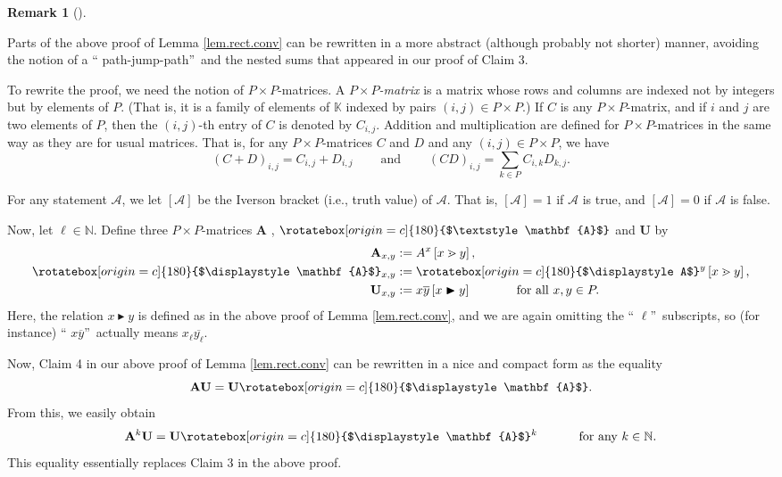 \documentclass[numbers=enddot,12pt,final,onecolumn,notitlepage]{scrartcl}%
\theoremstyle{definition}
\newtheorem{remk}[theo]{Remark}
\newenvironment{remark}[1][]
{\begin{remk}[#1]\begin{leftbar}}
{\end{leftbar}\end{remk}}
\newcommand{\upslack}{\mathchoice{\rotatebox[origin=c]{180}{$\displaystyle A$}}{\rotatebox[origin=c]{180}{$\textstyle A$}}{\rotatebox[origin=c]{180}{$\scriptstyle A$}}{\rotatebox[origin=c]{180}{$\scriptscriptstyle A$}}}
\newcommand{\downslack}{A}
\newcommand{\bfupslack}{\mathchoice{\rotatebox[origin=c]{180}{$\displaystyle \mathbf{A}$}}{\rotatebox[origin=c]{180}{$\textstyle \mathbf{A}$}}{\rotatebox[origin=c]{180}{$\scriptstyle \mathbf{A}$}}{\rotatebox[origin=c]{180}{$\scriptscriptstyle \mathbf{A}$}}}
\newcommand{\bfdownslack}{\mathbf{A}}
\let\sumnonlimits\sum
\renewcommand{\sum}{\sumnonlimits\limits}
\begin{document}
\begin{remark}
\label{rmk.lem.rect.conv.2}Parts of the above proof of Lemma
\ref{lem.rect.conv} can be rewritten in a more abstract (although probably not
shorter) manner, avoiding the notion of a \textquotedblleft
path-jump-path\textquotedblright\ and the nested sums that appeared in our
proof of Claim 3.

To rewrite the proof, we need the notion of $P\times P$-matrices.
A $P\times P$\emph{-matrix} is a matrix whose rows and columns are indexed not
by integers but by elements of $P$. (That is, it is a family of elements of
$\mathbb{K}$ indexed by pairs $\left(  i,j\right)  \in P\times P$.) If $C$ is
any $P\times P$-matrix, and if $i$ and $j$ are two elements of $P$, then the
$\left(  i,j\right)  $-th entry of $C$ is denoted by $C_{i,j}$. Addition and
multiplication are defined for $P\times P$-matrices in the same way as they
are for usual matrices. That is, for any $P\times P$-matrices $C$ and $D$ and
any $\left(  i,j\right)  \in P\times P$, we have%
\[
\left(  C+D\right)  _{i,j}=C_{i,j}+D_{i,j}\ \ \ \ \ \ \ \ \ \ \text{and}%
\ \ \ \ \ \ \ \ \ \ \left(  CD\right)  _{i,j}=\sum_{k\in P}C_{i,k}D_{k,j}.
\]


For any statement $\mathcal{A}$, we let $\left[  \mathcal{A}\right]  $ be the
Iverson bracket (i.e., truth value) of $\mathcal{A}$. That is, $\left[
\mathcal{A}\right]  =1$ if $\mathcal{A}$ is true, and $\left[  \mathcal{A}%
\right]  =0$ if $\mathcal{A}$ is false.

Now, let $\ell\in\mathbb{N}$. Define three $P\times P$-matrices $\bfdownslack$%
, $\bfupslack$ and $\mathbf{U}$ by
\begin{align*}
\bfdownslack_{x,y}  &  :=\downslack^{x}\left[  x\gtrdot y\right]  ,\\
\bfupslack_{x,y}  &  :=\upslack^{y}\left[  x\gtrdot y\right]  ,\\
\mathbf{U}_{x,y}  &  :=x\overline{y}\left[  x\blacktriangleright y\right]
\ \ \ \ \ \ \ \ \ \ \ \text{for all }x,y\in P.
\end{align*}
Here, the relation $x\blacktriangleright y$ is defined as in the above proof
of Lemma \ref{lem.rect.conv}, and we are again omitting the \textquotedblleft%
$\ell$\textquotedblright\ subscripts, so (for instance) \textquotedblleft%
$x\overline{y}$\textquotedblright\ actually means $x_{\ell}\overline{y_{\ell}%
}$.

Now, Claim 4 in our above proof of Lemma \ref{lem.rect.conv} can be rewritten
in a nice and compact form as the equality%
\[
\bfdownslack \mathbf{U}=\mathbf{U}\bfupslack.
\]
From this, we easily obtain%
\begin{equation}
\bfdownslack^{k}\mathbf{U}=\mathbf{U}\bfupslack^{k}%
\ \ \ \ \ \ \ \ \ \ \text{for any }k\in\mathbb{N}.
\label{eq.rmk.lem.rect.conv.2.k}%
\end{equation}
This equality essentially replaces Claim 3 in the above proof.


\end{remark}
\end{document}
